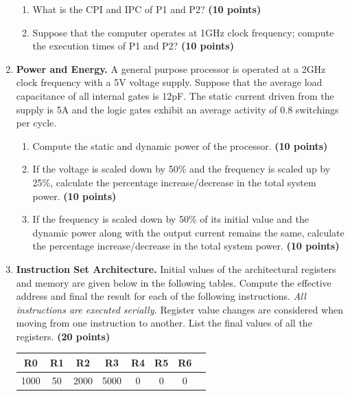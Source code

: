 \documentclass[a4paper, 15pt]{exam}
\begin{document}
\begin{enumerate}
\begin{center}
\begin{tabular}{ |c|c|c|c|}
\end{tabular}
\end{center}
\begin{enumerate}
\item What is the CPI and IPC of P1 and P2?
\textbf{(10 points)}
\item Suppose that the computer operates at 1GHz clock frequency; compute the execution times of P1 and P2?
 \textbf {(10 points)}

\end{enumerate}
    \item \textbf{Power and Energy.} A general purpose processor is operated at a 2GHz clock frequency with a 5V voltage supply. Suppose that the average load capacitance of all internal gates is 12pF. The static current driven from the supply is 5A and the logic gates exhibit an average activity of 0.8 switchings per cycle.
    \begin{enumerate}
    \item Compute the static and dynamic power of the processor. \textbf{(10 points)}
        \item If the voltage is scaled down by 50\% and the frequency is scaled up by 25\%, calculate the percentage increase/decrease in the total system power.   \textbf{(10 points)}
        \item If the frequency is scaled down by 50\% of its initial value and the dynamic power along with the output current remains the same, calculate the percentage increase/decrease in the total system power.  \textbf{(10 points)}
        

	\end{enumerate}

 \item \textbf{Instruction Set Architecture.} Initial values of the architectural registers and memory are given below in the following tables. Compute the effective address and final the result for each of the following instructions. \textit{All instructions are executed serially.} Register value changes are considered when moving from one instruction to another. List the final values of all the registers. \textbf{(20 points)}
 
 \begin{center}
 	\begin{tabular}{ |c|c|c|c|c|c|c|c|} 
 		\hline
 		R0 & R1 & R2& R3 & R4 &R5&R6\\ 
 		\hline
 		1000 & 50 & 2000 & 5000 &0 & 0 & 0\\ 
 		\hline
 	\end{tabular}
 \end{center}
 

\end{enumerate}
\end{document}
